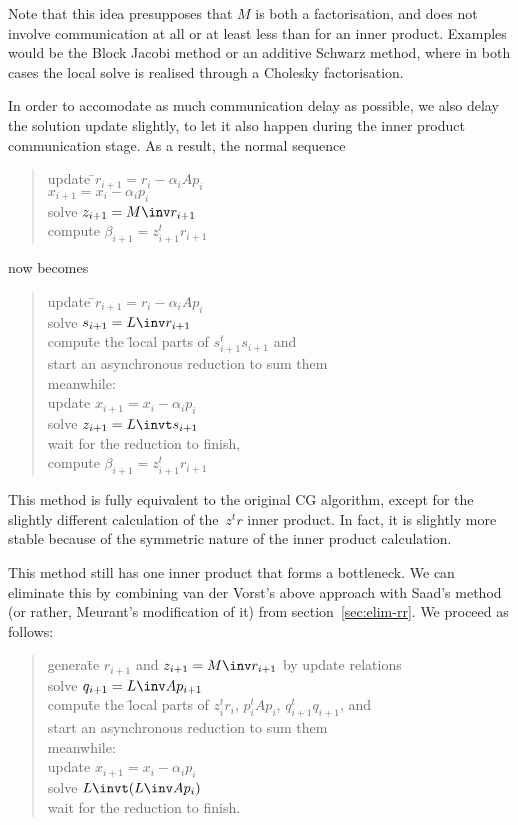 \documentclass[11pt]{artikel3}
\begin{document}
\begin{Outline}
Note that this idea presupposes that $M$ is both a factorisation, and
does not involve communication at all or at least less than for an
inner product. Examples would be the  Block Jacobi method or an
additive Schwarz method, where in both cases the local solve is
realised through a Cholesky factorisation.

In order to accomodate as much communication delay as possible, we
also delay the solution update slightly, to let it also happen during
the inner product communication stage. As a result, the normal
sequence
\begin{quotation}\begin{tabbing}
update \=$r_{i+1}=r_i-\alpha_iAp_i$\\
\>$x_{i+1}=x_i-\alpha_ip_i$\\
solve $z_{i+1}=M\inv r_{i+1}$\\
compute $\beta_{i+1}=z_{i+1}^tr_{i+1}$
\end{tabbing}\end{quotation}
now becomes
\begin{quotation}\begin{tabbing}
update \=$r_{i+1}=r_i-\alpha_iAp_i$\\
solve $s_{i+1}=L\inv r_{i+1}$\\
compu\=te the \=local parts of $s_{i+1}^ts_{i+1}$ and\\
\>\>start an asynchronous reduction to sum them\\
meanwhile:\\
\>update $x_{i+1}=x_i-\alpha_ip_i$\\
\>solve $z_{i+1}=L\invt s_{i+1}$\\
wait for the reduction to finish,\\
compute $\beta_{i+1}=z_{i+1}^tr_{i+1}$
\end{tabbing}\end{quotation}
This method is fully equivalent to the original CG algorithm, except
for the slightly different calculation of the~$z^tr$ inner product. In
fact, it is slightly more stable because of the symmetric nature of
the inner product calculation.

This method still has one inner product that forms a bottleneck. We
can eliminate this by combining van der Vorst's above
approach with Saad's method (or rather, Meurant's modification of it)
from section~\ref{sec:elim-rr}. We proceed as follows:
\begin{quotation}\begin{tabbing}
genera\=te $r_{i+1}$ and $z_{i+1}=M\inv r_{i+1}$ by update relations\\
solve $q_{i+1}=L\inv Ap_{i+1}$\\
compu\=te the \=local parts of $z_i^tr_i$, $p_i^tAp_i$, $q_{i+1}^tq_{i+1}$, and\\
\>\>start an asynchronous reduction to sum them\\
meanwhile:\\
\>update $x_{i+1}=x_i-\alpha_ip_i$\\
\>solve $L\invt (L\inv Ap_i)$\\
wait for the reduction to finish.
\end{tabbing}\end{quotation}


\end{Outline}
\end{document}
